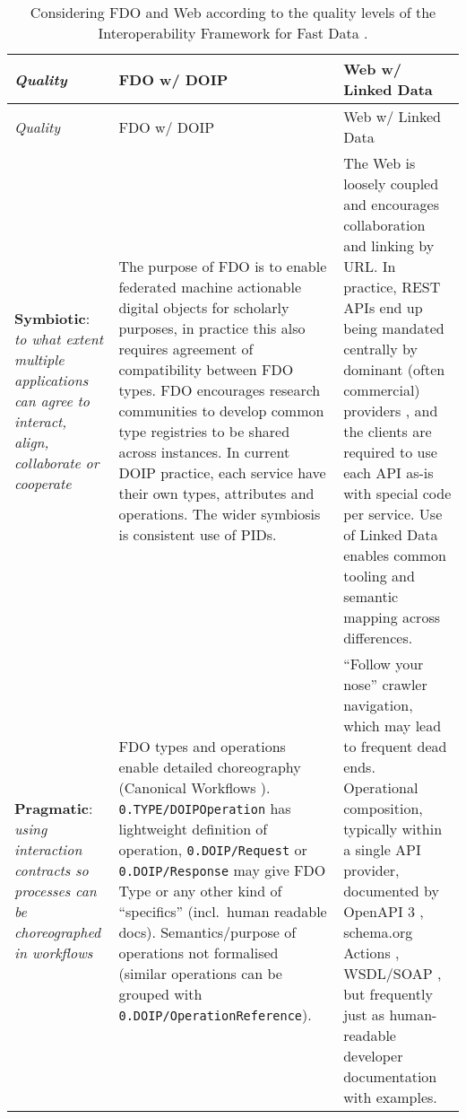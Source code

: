 \renewcommand*{\arraystretch}{1.4}
\begin{longtable}[]{@{}
  >{\raggedright\arraybackslash}p{}
  >{\arraybackslash}p{}
  >{\arraybackslash}p{}@{}}
\caption{Considering FDO and Web according to the quality levels of the Interoperability Framework for Fast Data \cite{delgadoInteroperabilityFrameworkDistributed2016a}.
\label{ch3:fdo-web-interoperability-framework}}\tabularnewline
\toprule
\emph{Quality} & 
FDO w/ DOIP & 
Web w/ Linked Data \\
\midrule
\endfirsthead
\toprule
\emph{Quality} & 
FDO w/ DOIP & 
Web w/ Linked Data \\
\midrule
\endhead
\textbf{Symbiotic}: \emph{to what extent multiple applications can agree to interact, align, collaborate or cooperate}
  & The purpose of FDO is to enable federated machine actionable digital objects for scholarly purposes, in practice this also requires agreement of compatibility between FDO types. FDO encourages research communities to develop common type registries to be shared across instances. In current DOIP practice, each service have their own types, attributes and operations. The wider symbiosis is consistent use of PIDs.
  & The Web is loosely coupled and encourages collaboration and linking by URL. In practice, REST APIs \cite{fieldingArchitecturalStylesDesign2000a} end up being mandated centrally by dominant (often commercial) providers \cite{fieldingReflectionsRESTArchitectural2017a}, and the clients are required to use each API as-is with special code per service. Use of Linked Data enables common tooling and semantic mapping across differences. \\
\textbf{Pragmatic}: \emph{using interaction contracts so processes can be choreographed in workflows}
  & FDO types and operations enable detailed choreography (Canonical Workflows \cite{cwfr}). \texttt{0.TYPE/DOIPOperation} has lightweight definition of operation, \texttt{0.DOIP/Request} or \texttt{0.DOIP/Response} may give FDO Type or any other kind of ``specifics'' (incl.~human readable docs). Semantics/purpose of operations not formalised (similar operations can be grouped with \texttt{0.DOIP/OperationReference}).
  & ``Follow your nose'' crawler navigation, which may lead to frequent dead ends. Operational composition, typically within a single API provider, documented by OpenAPI 3 \cite{OpenAPISpecificationV3}, schema.org Actions \cite{SchemaOrgActions}, WSDL/SOAP \cite{w3-wsdl20-primer}, but frequently just as human-readable developer documentation with examples. \\

\end{longtable}
